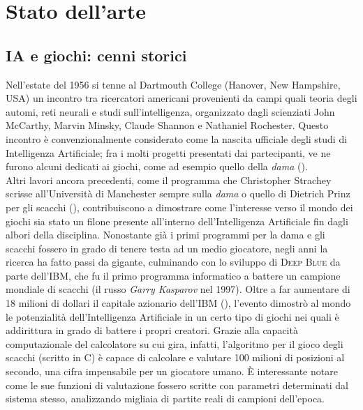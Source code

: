 \chapter*{Stato dell'arte}
\graphicspath{{Chapter2/Chapter2Figs/PNG/}{Chapter2/Chapter2Figs/PDF/}{Chapter2/Chapter2Figs/}}

\section{IA e giochi: cenni storici}

Nell'estate del 1956 si tenne al Dartmouth College (Hanover, New Hampshire, USA) un incontro tra ricercatori americani provenienti da campi quali teoria degli automi, reti neurali e studi sull'intelligenza, organizzato dagli scienziati John McCarthy, Marvin Minsky, Claude Shannon e Nathaniel Rochester.
Questo incontro è convenzionalmente considerato come la nascita ufficiale degli studi di Intelligenza Artificiale; fra i molti progetti presentati dai partecipanti, ve ne furono alcuni dedicati ai giochi, come ad esempio quello della \emph{dama} (\cite{randw}).\\
Altri lavori ancora precedenti, come il programma che Christopher Strachey scrisse all'Università di Manchester sempre sulla \emph{dama} o quello di Dietrich Prinz per gli scacchi (\cite{historyofcomputing}), contribuiscono a dimostrare come l'interesse verso il mondo dei giochi sia stato un filone presente all'interno dell'Intelligenza Artificiale fin dagli albori della disciplina.
Nonostante già i primi programmi per la dama e gli scacchi fossero in grado di tenere testa ad un medio giocatore, negli anni la ricerca ha fatto passi da gigante, culminando con lo sviluppo di \textsc{Deep Blue} da parte dell'\textsc{IBM}, che fu il primo programma informatico a battere un campione mondiale di scacchi (il russo \emph{Garry Kasparov} nel 1997).
Oltre a far aumentare di 18 milioni di dollari il capitale azionario dell'\textsc{IBM} (\cite{randw}), l'evento dimostrò al mondo le potenzialità dell'Intelligenza Artificiale in un certo tipo di giochi nei quali è addirittura in grado di battere i propri creatori.
Grazie alla capacità computazionale del calcolatore su cui gira, infatti, l’algoritmo per il gioco degli scacchi (scritto in C) è capace di calcolare e valutare 100 milioni di posizioni al secondo, una cifra impensabile per un giocatore umano.
È interessante notare come le sue funzioni di valutazione fossero scritte con parametri determinati dal sistema stesso, analizzando migliaia di partite reali di campioni dell'epoca.\\
